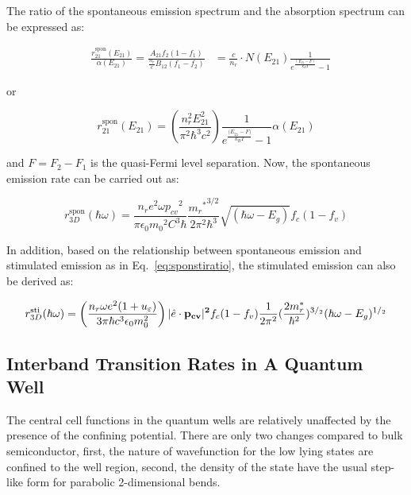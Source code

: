 The ratio of the spontaneous emission spectrum and the absorption
spectrum can be expressed as:

\begin{eqnarray}
  & \frac{r_{21}^{\text{spon}}\left( E_{21} \right)}{\alpha\left( E_{21} \right)} = \frac{A_{21}f_{2}\left( 1 - f_{1} \right)}{\frac{n_{r}}{c}B_{12}\left( f_{1} - f_{2} \right)}
  & = \frac{c}{n_{r}}\cdot{N}\left( E_{21} \right)\frac{1}{e^{\frac{(E_{21} - F)}{k_{B}T}} - 1}
\end{eqnarray}

or

\begin{equation}
  r_{21}^{\text{spon}}\left( E_{21} \right) = (\frac{n_{r}^{2}E_{21}^{2}}{\pi^{2}\hbar^{3}c^{2}})\frac{1}{e^{\frac{{(E}_{21} - F)}{k_{B}T}} - 1}\alpha\left( E_{21} \right)
\end{equation}

and \(F = F_{2} - F_{1}\) is the quasi-Fermi level separation. Now, the
spontaneous emission rate can be carried out as:

\begin{equation}
r_{3D}^{\mathrm{spon}}(\hbar\omega)=\frac{{n_r}{e^2}\omega{p_{cv}}^2}{{\pi}\epsilon_0{m_0}^2C^3{\hbar}}\frac{{{m_r}^\ast}^{3/2}}{2{\pi}^2{\hbar}^3}{\sqrt{(\hbar\omega-E_g)}}f_c(1-f_v)
\end{equation}

In addition, based on the relationship between spontaneous emission and
stimulated emission as in Eq.~\ref{eq:sponstiratio}, the stimulated emission
can also be derived as:

\begin{equation}
       r_{3D}^{\mathrm{sti}}(\hbar\omega)= \left(\frac{n_r\omega{e^2}(1+u_\varepsilon)}{3\pi\hbar{c^3}\epsilon_0m_0^2}\right){|\hat{e}\cdot\bf{p}_{cv}|^2}f_c(1-f_v) \frac{1}{2\pi^2}(\frac{2m_r^\ast}{\hbar^2})^{3/_2}(\hbar\omega-E_g)^{1/_2}
       \label{eq:3Dsti}
\end{equation}

\subsection{Interband Transition Rates in A Quantum
Well}\label{2DTR}

The central cell functions in the quantum wells are relatively
unaffected by the presence of the confining potential. There are only
two changes compared to bulk semiconductor, first, the nature of
wavefunction for the low lying states are confined to the well region,
second, the density of the state have the usual step-like form for
parabolic 2-dimensional bends.

